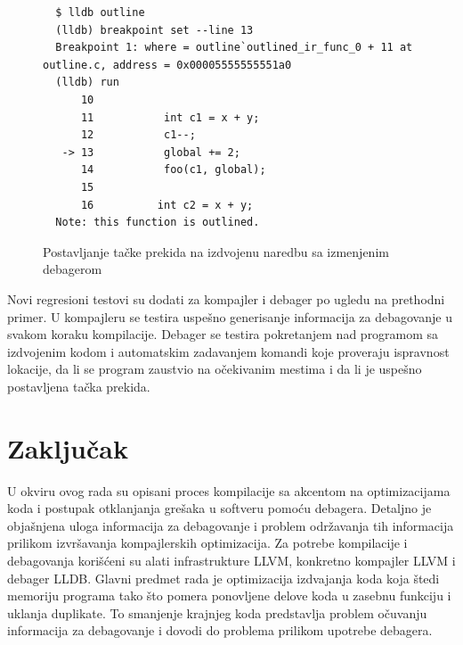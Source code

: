 \documentclass[12pt,oneside]{memoir}
\begin{document}
\begin{figure}[!ht]
\begin{verbatim}
  $ lldb outline
  (lldb) breakpoint set --line 13
  Breakpoint 1: where = outline`outlined_ir_func_0 + 11 at outline.c, address = 0x00005555555551a0
  (lldb) run
      10          
      11  	       int c1 = x + y;
      12  	       c1--;
   -> 13  	       global += 2;
      14  	       foo(c1, global);
      15          
      16          int c2 = x + y;
  Note: this function is outlined.
\end{verbatim}
\caption{Postavljanje tačke prekida na izdvojenu naredbu sa izmenjenim debagerom}
\label{lst:outlining_debug_breakpoint_after}
\end{figure}

Novi regresioni testovi su dodati za kompajler i debager po ugledu na prethodni primer.
U kompajleru se testira uspešno generisanje informacija za debagovanje u svakom koraku kompilacije.
Debager se testira pokretanjem nad programom sa izdvojenim kodom i automatskim zadavanjem komandi koje proveraju ispravnost lokacije, da li se program zaustvio na očekivanim mestima i da li je uspešno postavljena tačka prekida.


\chapter{Zaključak}
\label{sec:conclusion}

U okviru ovog rada su opisani proces kompilacije sa akcentom na optimizacijama koda i postupak otklanjanja grešaka u softveru pomoću debagera.
Detaljno je objašnjena uloga informacija za debagovanje i problem održavanja tih informacija prilikom izvršavanja kompajlerskih optimizacija.
Za potrebe kompilacije i debagovanja korišćeni su alati infrastrukture LLVM, konkretno kompajler LLVM i debager LLDB.
Glavni predmet rada je optimizacija izdvajanja koda koja štedi memoriju programa tako što pomera ponovljene delove koda u zasebnu funkciju i uklanja duplikate.
To smanjenje krajnjeg koda predstavlja problem očuvanju informacija za debagovanje i dovodi do problema prilikom upotrebe debagera.
\end{document}
